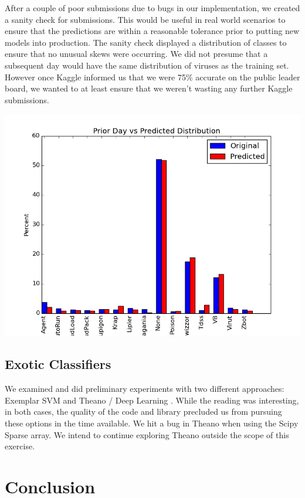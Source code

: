 \documentclass[11pt, oneside]{article}   	%
\begin{document}
After a couple of poor submissions due to bugs in our implementation, we created a sanity check for submissions. This would be useful in real world scenarios to ensure that the predictions are within a reasonable tolerance prior to putting new models into production. The sanity check displayed a distribution of classes to ensure that no unusual skews were occurring. We did not presume that a subsequent day would have the same distribution of viruses as the training set. However once Kaggle informed us that we were 75\% accurate on the public leader board, we wanted to at least ensure that we weren't wasting any further Kaggle submissions. 

\includegraphics[scale=.65]{predictVactual}

\subsection*{Exotic Classifiers}

We examined and did preliminary experiments with two different approaches: Exemplar SVM \cite{exemplar}  and Theano / Deep Learning \cite{deep}. While the reading was interesting, in both cases, the quality of the code and library precluded us from pursuing these options in the time available. We hit a bug in Theano when using the Scipy Sparse array. We intend to continue exploring Theano outside the scope of this exercise.


\section*{Conclusion}
\end{document}
